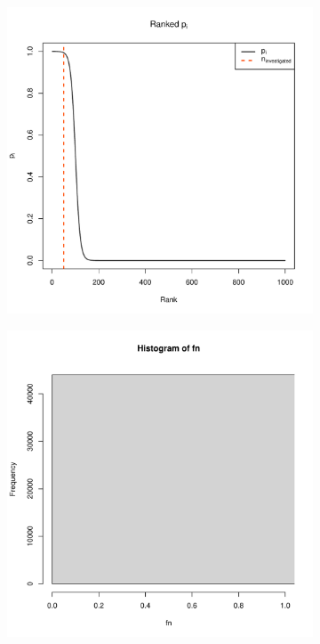 \documentclass{article}
\begin{document}
\begin{figure}[!htb]
    \centering
    \begin{subfigure}{0.45\textwidth}
        \centering
        \includegraphics[width=\textwidth, trim=1cm 1cm 1cm .5cm, clip]{ranked_notdone.pdf}
    \end{subfigure}
    \hfill
    \begin{subfigure}{0.45\textwidth}
        \centering
        \includegraphics[page=2, width=\textwidth, trim=1cm 1cm 1cm .5cm, clip]{coverage_notdone.pdf}
    \end{subfigure}
    

\end{figure}
\end{document}
